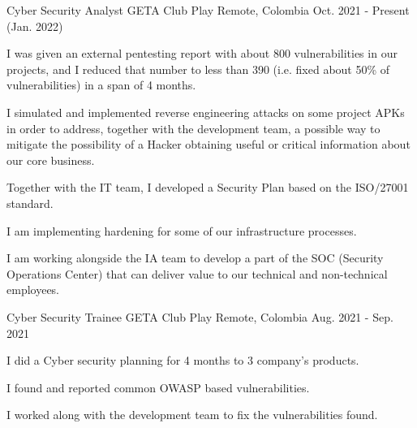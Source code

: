 

\begin{cventries}

  \cventry
    {Cyber Security Analyst} %
    {GETA Club Play} %
    {Remote, Colombia} %
    {Oct. 2021 - Present (Jan. 2022)} %
    {
      \begin{cvitems} %
        \item {I was given an external pentesting report with about 800 vulnerabilities in our
        projects, and I reduced that number to less than 390 (i.e. fixed about 50\% of
        vulnerabilities) in a span of 4 months.}
        \item {I simulated and implemented reverse engineering attacks on some project APKs in order
        to address, together with the development team, a possible way to mitigate the possibility
        of a Hacker obtaining useful or critical information about our core business.}
        \item {Together with the IT team, I developed a Security Plan based on the ISO/27001
        standard.}
        \item {I am implementing hardening for some of our infrastructure processes.}
        \item {I am working alongside the IA team to develop a part of the SOC (Security Operations
        Center) that can deliver value to our technical and non-technical employees.}
      \end{cvitems}
    }

  \cventry
    {Cyber Security Trainee} %
    {GETA Club Play} %
    {Remote, Colombia} %
    {Aug. 2021 - Sep. 2021} %
    {
      \begin{cvitems} %
        \item {I did a Cyber security planning for 4 months to 3 company's products.}
        \item {I found and reported common OWASP based vulnerabilities.}
        \item {I worked along with the development team to fix the vulnerabilities found.}
      \end{cvitems}
    }


\end{cventries}
